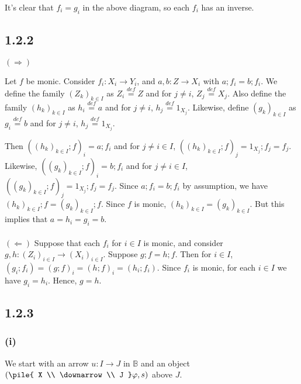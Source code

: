 \documentclass{article}
\newcommand{\defeq}{\overset{\mathit{def}}{=}}
\newcommand{\vrt}[2]{
\pile{
#1 \\
\downarrow \\
#2
}
}
\begin{document}
It's clear that $f_i = g_i$ in the above diagram, so each $f_i$ has an inverse.

\subsection*{1.2.2}

$(\Rightarrow)$

Let $f$ be monic.
Consider $f_i : X_i \to Y_i$, and $a,b : Z \to X_i$ with $a;f_i = b;f_i$. We define the 
family $(Z_k)_{k \in I}$ as $Z_i \defeq Z$ and for $j \neq i$, $Z_j \defeq X_j$.
Also define the family $(h_k)_{k \in I}$ as $h_i \defeq a$ and for $j \neq i$, $h_j \defeq 1_{X_j}$.
Likewise, define $(g_k)_{k \in I}$ as $g_i \defeq b$ and for $j \neq i$, $h_j \defeq 1_{X_j}$.

Then $((h_k)_{k \in I};f)_i = a;f_i$ and for $j \neq i \in I$, $((h_k)_{k \in I};f)_j = 1_{X_j};f_j = f_j$.
Likewise, $((g_k)_{k \in I};f)_i = b;f_i$ and for $j \neq i \in I$, $((g_k)_{k \in I};f)_j = 1_{X_j};f_j = f_j$.
Since $a;f_i = b;f_i$ by assumption, we have $(h_k)_{k \in I};f = (g_k)_{k \in I};f$. Since $f$ is monic,
$(h_k)_{k \in I} = (g_k)_{k \in I}$. But this implies that $a = h_i = g_i = b$.
~\\~\\
$(\Leftarrow)$
Suppose that each $f_i$ for $i \in I$ is monic, and consider $g,h : (Z_i)_{i \in I} \to (X_i)_{i \in I}$.
Suppose $g;f = h;f$. Then for $i \in I$, $(g_i;f_i) = (g;f)_i = (h;f)_i = (h_i;f_i)$. Since $f_i$ is monic,
for each $i \in I$ we have $g_i = h_i$. Hence, $g = h$.

\subsection*{1.2.3}

\subsubsection*{(i)}

We start with an arrow $u : I \to J$ in $\mathbb B$ and an object $(\vrt{X}{J}\varphi, s)$ above $J$.

\end{document}
